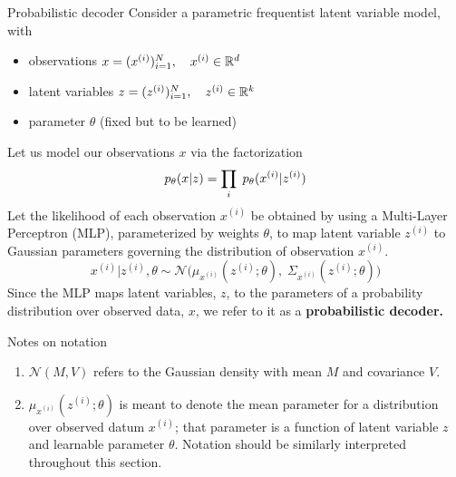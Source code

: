 \documentclass[10pt]{beamer}
\newcommand{\obs}{x^{(i)} }
\newcommand{\alatent}{z^{(i)} }
\newcommand{\N}{\mathcal{N}}
\begin{document}
\begin{frame}{Probabilistic decoder}
\footnotesize
Consider a parametric frequentist latent variable model, with 
\begin{itemize}
\item observations $x = (\obs)_{i=1}^N, \quad \obs \in \R^d$
\item latent variables $z =(\alatent)_{i=1}^N, \quad \alatent \in \R^k$
\item parameter $\theta$ (fixed but to be learned)
\end{itemize}

Let us model our observations $x$ via the factorization
\[ p_\theta(x |z )= \ds\prod_i \; p_\theta( \obs | \alatent ) \] 
Let the likelihood of each observation $\obs$ be obtained by using a Multi-Layer Perceptron (MLP), parameterized by weights $\theta$, to map latent variable $\alatent$ to Gaussian parameters governing the distribution of observation $x^{(i)}$.
\begin{equation} x^{(i)} | \alatent, \theta \sim \N \big(\mu_{x^{(i)}}( \alatent; \theta), \; \Sigma_{x^{(i)}} (\alatent; \theta) \big)  
\label{likelihood} 
\end{equation}
Since the MLP maps latent variables, $z$, to the parameters of a probability distribution over observed data, $x$, we refer to it as a \bf{probabilistic decoder.}

\vfill

\tiny  Notes on notation
\begin{enumerate}
\item $\N(M,V)$ refers to the Gaussian density with mean $M$ and covariance $V$.
\item $\mu_{\obs}(\alatent; \theta)$ is meant to denote the mean parameter for a distribution over observed datum $\obs$; that parameter is a function of latent variable $z$ and learnable parameter $\theta$. Notation should be similarly interpreted throughout this section.
\end{enumerate}

\end{frame}
\end{document}
